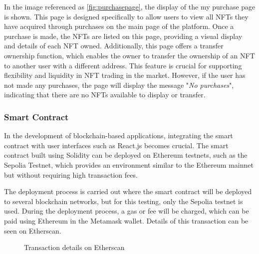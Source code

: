     In the image referenced as \ref{fig:purchasepage}, the display of the my purchase page is shown. This page is designed specifically to allow users to view all NFTs they have acquired through purchases on the main page of the platform. Once a purchase is made, the NFTs are listed on this page, providing a visual display and details of each NFT owned. Additionally, this page offers a transfer ownership function, which enables the owner to transfer the ownership of an NFT to another user with a different address. This feature is crucial for supporting flexibility and liquidity in NFT trading in the market. However, if the user has not made any purchases, the page will display the message "\emph{No purchases}", indicating that there are no NFTs available to display or transfer.

\subsubsection{Smart Contract}
In the development of blockchain-based applications, integrating the smart contract with user interfaces such as React.js becomes crucial. The smart contract built using Solidity can be deployed on Ethereum testnets, such as the Sepolia Testnet, which provides an environment similar to the Ethereum mainnet but without requiring high transaction fees.

The deployment process is carried out where the smart contract will be deployed to several blockchain networks, but for this testing, only the Sepolia testnet is used. During the deployment process, a gas or fee will be charged, which can be paid using Ethereum in the Metamask wallet. Details of this transaction can be seen on Etherscan.

\begin{figure} [H] \centering
  \caption{Transaction details on Etherscan}
  \label{fig:transaction}
\end{figure}

